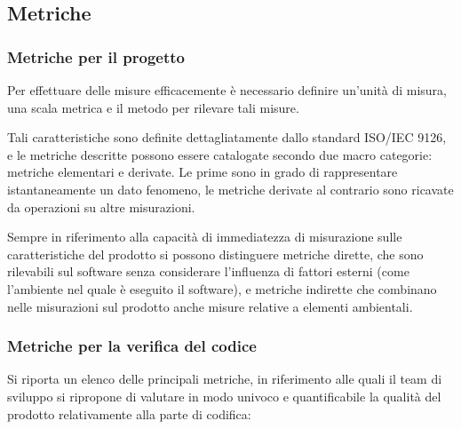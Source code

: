 \subsection{Metriche}
\subsubsection{Metriche per il progetto}
Per effettuare delle misure efficacemente è necessario definire un'unità di misura, una scala metrica e il metodo per rilevare tali misure.

Tali caratteristiche sono definite dettagliatamente dallo standard ISO/IEC 9126, e le metriche descritte possono essere catalogate secondo due macro categorie: metriche elementari e derivate. Le prime sono in grado di rappresentare istantaneamente un dato fenomeno, le metriche derivate al contrario sono ricavate da operazioni su altre misurazioni.

Sempre in riferimento alla capacità di immediatezza di misurazione sulle caratteristiche del prodotto si possono distinguere metriche dirette, che sono rilevabili sul software senza considerare l'influenza di fattori esterni (come l'ambiente nel quale è eseguito il software), e metriche indirette che combinano nelle misurazioni sul prodotto anche misure relative a elementi ambientali.

\subsubsection{Metriche per la verifica del codice}\label{sec:metrics}

Si riporta un elenco delle principali metriche, in riferimento alle quali il team di sviluppo si ripropone di valutare in modo univoco e quantificabile la qualità del prodotto relativamente alla parte di codifica:

